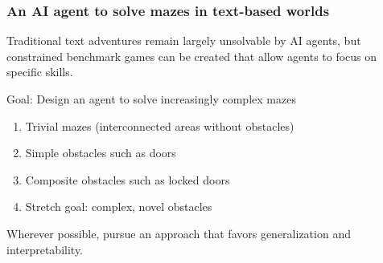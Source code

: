 \begin{frame}

    \frametitle{An AI agent to solve mazes in text-based worlds}

    Traditional text adventures remain largely unsolvable by AI agents,
    but constrained benchmark games can be created that allow agents to
    focus on specific skills.

    \begin{block}{Goal: Design an agent to solve increasingly
        complex mazes}
        \begin{enumerate}
            \item Trivial mazes (interconnected areas without obstacles) 
            \item Simple obstacles such as doors
            \item Composite obstacles such as locked doors
            \item Stretch goal: complex, novel obstacles
        \end{enumerate}

        Wherever possible, pursue an approach that favors generalization
        and interpretability.

    \end{block}

\end{frame}
